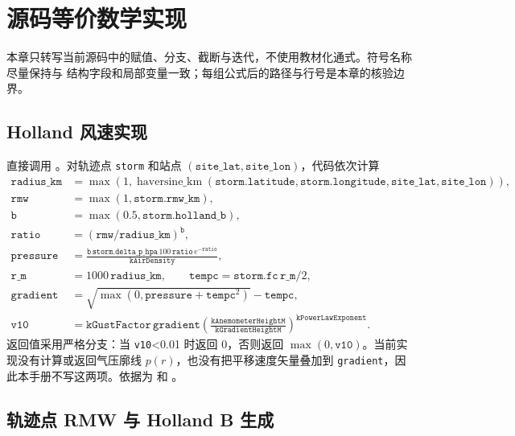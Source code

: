\section{源码等价数学实现}

本章只转写当前源码中的赋值、分支、截断与迭代，不使用教材化通式。符号名称尽量保持与
结构字段和局部变量一致；每组公式后的路径与行号是本章的核验边界。

\subsection{Holland 风速实现}

 直接调用
。对轨迹点 \texttt{storm} 和站点
$(\texttt{site\_lat},\texttt{site\_lon})$，代码依次计算
\begin{align}
 \texttt{radius\_km}&=\max\!\left(1,
   \operatorname{haversine\_km}(\texttt{storm.latitude},\texttt{storm.longitude},
   \texttt{site\_lat},\texttt{site\_lon})\right),\\
 \texttt{rmw}&=\max(1,\texttt{storm.rmw\_km}),\\
 \texttt{b}&=\max(0.5,\texttt{storm.holland\_b}),\\
 \texttt{ratio}&=(\texttt{rmw}/\texttt{radius\_km})^{\texttt b},\\
 \texttt{pressure}&=
   \frac{\texttt b\,\texttt{storm.delta\_p\_hpa}\,100\,
   \texttt{ratio}\,e^{-\texttt{ratio}}}{\texttt{kAirDensity}},\\
 \texttt{r\_m}&=1000\,\texttt{radius\_km},\qquad
 \texttt{tempc}=\texttt{storm.fc}\,\texttt{r\_m}/2,\\
 \texttt{gradient}&=\sqrt{\max(0,\texttt{pressure}+\texttt{tempc}^{2})}-\texttt{tempc},\\
 \texttt{v10}&=\texttt{kGustFactor}\,\texttt{gradient}
 \left(\frac{\texttt{kAnemometerHeightM}}{\texttt{kGradientHeightM}}\right)^{\texttt{kPowerLawExponent}}.
\end{align}
返回值采用严格分支：当 \texttt{v10}<0.01 时返回 0，否则返回
$\max(0,\texttt{v10})$。当前实现没有计算或返回气压廓线 $p(r)$，也没有把平移速度矢量叠加到
\texttt{gradient}，因此本手册不写这两项。依据为
 和
。

\subsection{轨迹点 RMW 与 Holland B 生成}

